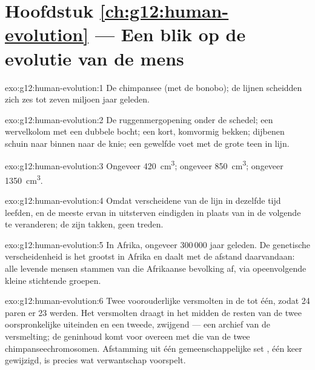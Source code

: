 \section*{Hoofdstuk \ref{ch:g12:human-evolution} --- Een blik op de evolutie van de mens}

\begin{solution}{exo:g12:human-evolution:1}
De chimpansee (met de bonobo); de lijnen scheidden zich zes tot zeven
miljoen jaar geleden.
\end{solution}

\begin{solution}{exo:g12:human-evolution:2}
De ruggenmergopening onder de schedel; een wervelkolom met een dubbele
bocht; een kort, komvormig bekken; dijbenen schuin naar binnen naar de
knie; een gewelfde voet met de grote teen in lijn.
\end{solution}

\begin{solution}{exo:g12:human-evolution:3}
Ongeveer \qty{420}{cm^3}; ongeveer \qty{850}{cm^3}; ongeveer \qty{1350}{cm^3}.
\end{solution}

\begin{solution}{exo:g12:human-evolution:4}
Omdat verscheidene  van de lijn in dezelfde tijd leefden, en de
meeste ervan in uitsterven eindigden in plaats van in de volgende te
veranderen; de  zijn takken, geen treden.
\end{solution}

\begin{solution}{exo:g12:human-evolution:5}
In Afrika, ongeveer 300\,000 jaar geleden. De genetische verscheidenheid
is het grootst in Afrika en daalt met de afstand daarvandaan: alle levende
mensen stammen van die Afrikaanse bevolking af, via opeenvolgende kleine
stichtende groepen.
\end{solution}

\begin{solution}{exo:g12:human-evolution:6}
Twee voorouderlijke  versmolten in de  tot één,
zodat 24 paren er 23 werden. Het versmolten  draagt in het
midden de resten van de twee oorspronkelijke uiteinden en een tweede,
zwijgend  --- een archief van de versmelting; de geninhoud komt
 voor  overeen met die van de twee chimpanseechromosomen. Afstamming
uit één gemeenschappelijke set , één keer gewijzigd, is precies
wat verwantschap voorspelt.
\end{solution}

